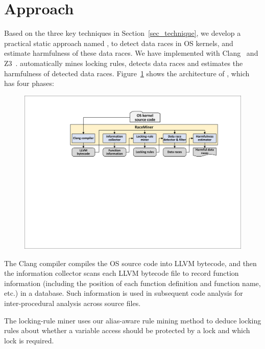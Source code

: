 \section{\sys Approach}
\label{sec_framework}

Based on the three key techniques in Section~\ref{sec_technique}, we develop a 
practical static approach named \sys, to detect data races in OS kernels, and 
estimate harmfulness of these data races. We have implemented \sys with 
Clang~\cite{clang} and Z3~\cite{z3}. \sys automatically mines locking rules, 
detects data races and estimates the harmfulness of detected data races. 
Figure~\ref{fig_architecture} shows the architecture of \sys, which has four 
phases:

\begin{figure}[htbp]
	\centering
	\includegraphics[width=1\linewidth]{figures/fig_architecture.pdf}
	\label{fig_architecture}
\end{figure}

 The Clang compiler compiles the OS source 
code into LLVM bytecode, and then the information collector scans each LLVM 
bytecode file to record function information (including the position of each 
function definition and function name, etc.) in a database. Such information is 
used in subsequent code analysis for inter-procedural analysis across source 
files.

 The locking-rule miner uses our alias-aware rule 
mining method to deduce locking rules about whether a variable access should be 
protected by a lock and which lock is required.

